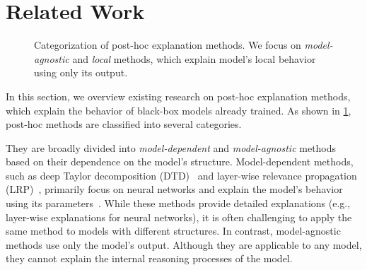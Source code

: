 \documentclass[runningheads]{llncs}
\begin{document}
\section{Related Work}
\begin{figure}[tbp]
  \centering
  \def\w{2.5}
  \def\ww{5.0}
  \def\h{0.5}
  \def\hh{1.3}
  \def\hhh{1.8}
  \def\hhhh{2.6}
  \caption{%
    Categorization of post-hoc explanation methods.
    We focus on \emph{model-agnostic} and \emph{local} methods,
    which explain model's local behavior using only its output.
  }\label{fig:post-hoc}
\end{figure}
In this section,
we overview existing research on post-hoc explanation methods,
which explain the behavior of black-box models already trained.
As shown in \cref{fig:post-hoc},
post-hoc methods are classified into several categories.

They are broadly divided into
\emph{model-dependent} and \emph{model-agnostic} methods
based on their dependence on the model's structure.
Model-dependent methods,
such as deep Taylor decomposition (DTD)~\cite{montavon2017explaining}
and layer-wise relevance propagation (LRP)~\cite{bach2015pixel},
primarily focus on neural networks and
explain the model's behavior using its parameters~\cite{samek2021explaining}.
While these methods provide detailed explanations
(e.g., layer-wise explanations for neural networks),
it is often challenging
to apply the same method to models with different structures.
In contrast,
model-agnostic methods use only the model's output.
Although they are applicable to any model,
they cannot explain the internal reasoning processes of the model.
\end{document}
